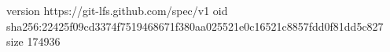 version https://git-lfs.github.com/spec/v1
oid sha256:22425f09cd3374f7519468671f380aa025521e0c16521c8857fdd0f81dd5c827
size 174936
